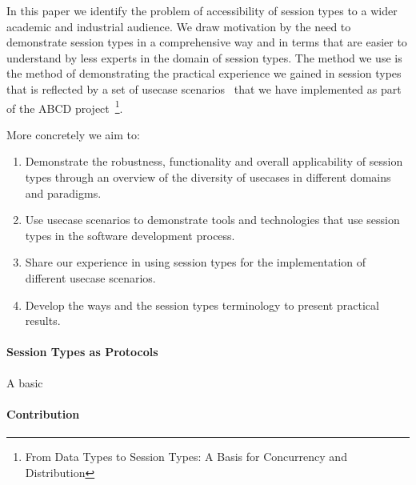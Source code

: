 In this paper we identify the problem of accessibility of session
types to a wider academic and industrial audience.
We draw motivation by the need to demonstrate session
types in a comprehensive way and in terms that are easier to
understand by less experts in the domain of session types.
The method we use is the method of demonstrating the practical
experience we gained in session types that is reflected by a set of
usecase scenarios~\cite{usecase_repository} that we have implemented as part of 
the ABCD project~\cite{ABCD}\footnote{From Data Types to Session Types:
A Basis for Concurrency and Distribution}.

More concretely we aim to:
%
\begin{enumerate}%
	\item	Demonstrate the robustness, functionality and overall applicability of session types
			through an overview of the diversity of usecases in different domains
			and paradigms.

	\item	Use usecase scenarios to demonstrate tools and technologies that
			use session types in the software development process.

	\item	Share our experience in using session types for the
			implementation of different usecase scenarios.

	\item	Develop the ways and the session types terminology to
			present practical results.
\end{enumerate}

\paragraph{Session Types as Protocols}
A basic 

\paragraph{Contribution}




